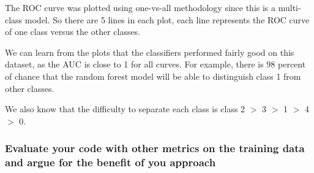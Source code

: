 \documentclass[12pt]{article}
\begin{document}
\begin{figure}[H]
\captionsetup[subfigure]{labelformat=empty}
\centering
{}
\end{figure}
\vspace*{-1.5cm}
The ROC curve was plotted using one-vs-all methodology since this is a multi-class model. So there are 5 lines in each plot, each line represents the ROC curve of one class versus the other classes.

We can learn from the plots that the classifiers performed fairly good on this dataset, as the AUC is close to 1 for all curves. For example, there is 98 percent of chance that the random forest model will be able to distinguish class 1 from other classes. 

We also know that the difficulty to separate each class is class 2 $>$ 3 $>$ 1 $>$ 4 $>$ 0.

\subsubsection{Evaluate your code with other metrics on the training data and argue for the benefit of you approach}
\end{document}

